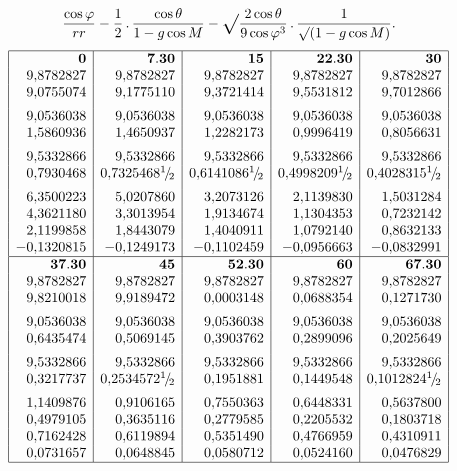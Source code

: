 \clearpage{}
\begingroup\makeatletter\let\veqno\@@leqno\makeatother
\newcommand{\vsroot}[1]{\mathord{\vcenter{\hbox{\Large\(\surd\)}}}#1}
\begin{center}\end{center}
\[\frac{\cos\varphi}{rr}-\frac12\,{.}\,\frac{\cos\theta}{1-g\cos M}-\vsroot{\frac{2\cos\theta}{9\cos\varphi^3}}\,{.}\,\frac1{\surd(1-g\cos M)}.\]
\begingroup\small\setlength{\arraycolsep}{8pt}\renewcommand{\arraystretch}{1.12}
\[\begin{array}{|r|r|r|r|r|}\hline
\mathbf{0}&\mathbf{7{.}30}&\mathbf{15}&\mathbf{22{.}30}&\mathbf{30}\\
9{,}8782827&9{,}8782827&9{,}8782827&9{,}8782827&9{,}8782827\\
9{,}0755074&9{,}1775110&9{,}3721414&9{,}5531812&9{,}7012866\\[5pt]
9{,}0536038&9{,}0536038&9{,}0536038&9{,}0536038&9{,}0536038\\
1{,}5860936&1{,}4650937&1{,}2282173&0{,}9996419&0{,}8056631\\[5pt]
9{,}5332866&9{,}5332866&9{,}5332866&9{,}5332866&9{,}5332866\\
0{,}7930468&0{,}7325468{}^{1}\! /\! {}_{2}&0{,}6141086{}^{1}\! /\! {}_{2}&0{,}4998209{}^{1}\! /\! {}_{2}&0{,}4028315{}^{1}\! /\! {}_{2}\\[5pt]
6{,}3500223&5{,}0207860&3{,}2073126&2{,}1139830&1{,}5031284\\
4{,}3621180&3{,}3013954&1{,}9134674&1{,}1304353&0{,}7232142\\
2{,}1199858&1{,}8443079&1{,}4040911&1{,}0792140&0{,}8632133\\
-0{,}1320815&-0{,}1249173&-0{,}1102459&-0{,}0956663&-0{,}0832991\\\hline
\mathbf{37{.}30}&\mathbf{45}&\mathbf{52{.}30}&\mathbf{60}&\mathbf{67{.}30}\\
9{,}8782827&9{,}8782827&9{,}8782827&9{,}8782827&9{,}8782827\\
9{,}8210018&9{,}9189472&0{,}0003148&0{,}0688354&0{,}1271730\\[5pt]
9{,}0536038&9{,}0536038&9{,}0536038&9{,}0536038&9{,}0536038\\
0{,}6435474&0{,}5069145&0{,}3903762&0{,}2899096&0{,}2025649\\[5pt]
9{,}5332866&9{,}5332866&9{,}5332866&9{,}5332866&9{,}5332866\\
0{,}3217737&0{,}2534572{}^{1}\! /\! {}_{2}&0{,}1951881&0{,}1449548&0{,}1012824{}^{1}\! /\! {}_{2}\\[5pt]
1{,}1409876&0{,}9106165&0{,}7550363&0{,}6448331&0{,}5637800\\
0{,}4979105&0{,}3635116&0{,}2779585&0{,}2205532&0{,}1803718\\
0{,}7162428&0{,}6119894&0{,}5351490&0{,}4766959&0{,}4310911\\
0{,}0731657&0{,}0648845&0{,}0580712&0{,}0524160&0{,}0476829\\\hline
\end{array}\]
